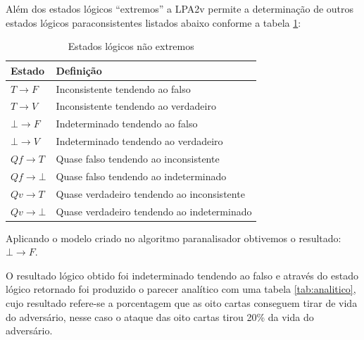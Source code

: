 Além dos estados lógicos “extremos” a LPA2v permite a determinação de outros estados lógicos paraconsistentes listados abaixo conforme a tabela \ref{tab:estadosnle}:

\begin{table}[htb]
	\centering
	\caption{Estados lógicos não extremos}
	\label{tab:estadosnle}
	\begin{tabular}{|l|l|}
		\hline
		Estado & Definição                                  \\ \hline
		$T \rightarrow F$  		& Inconsistente tendendo ao falso            \\ \hline
		$T \rightarrow V$  		& Inconsistente tendendo ao verdadeiro       \\ \hline
		$\bot \rightarrow F$ 	& Indeterminado tendendo ao falso            \\ \hline
		$\bot \rightarrow V$    & Indeterminado tendendo ao verdadeiro       \\ \hline
		$Qf \rightarrow T$ 		& Quase falso tendendo ao inconsistente      \\ \hline
		$Qf \rightarrow \bot$   & Quase falso tendendo ao indeterminado      \\ \hline
		$Qv \rightarrow T$ 		& Quase verdadeiro tendendo ao inconsistente \\ \hline
		$Qv \rightarrow \bot$ 	& Quase verdadeiro tendendo ao indeterminado \\ \hline
	\end{tabular}
\end{table}

Aplicando o modelo criado no algoritmo paranalisador obtivemos o resultado: $\bot \rightarrow F$.

\newpage

O resultado lógico obtido foi indeterminado tendendo ao falso e através do estado lógico retornado foi produzido o parecer analítico com uma tabela \ref{tab:analitico}, cujo resultado refere-se a porcentagem que as oito cartas conseguem tirar de vida do adversário, nesse caso o ataque das oito cartas tirou 20\% da vida do adversário.


